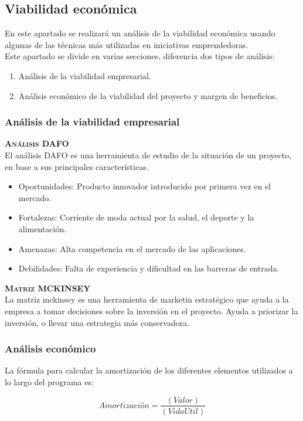 \subsection{Viabilidad económica}
En este apartado se realizará un análisis de la viabilidad económica usando algunas de las técnicas más utilizadas en iniciativas emprendedoras.\\
Este apartado se divide en varias secciones, diferencia dos tipos de análisis:
\begin{enumerate}
\item Análisis  de la viabilidad empresarial.
\item Análisis económico de la viabilidad del proyecto y margen de beneficios.
\end{enumerate}
\subsubsection{Análisis de la viabilidad empresarial}
\textbf{\textsc{Análisis DAFO}}\\
El análisis DAFO \cite{DAFO} es una herramienta de estudio de la situación de un proyecto, en base a sus principales características.
\begin{itemize}
\item Oportunidades: Producto innovador introducido por primera vez en el mercado.
\item Fortalezas: Corriente de moda actual por la salud, el deporte y la alimentación.
\item Amenazas: Alta competencia en el mercado de las aplicaciones.
\item Debilidades: Falta de experiencia y dificultad en las barreras de entrada.
\end{itemize}
\textbf{\textsc{Matriz MCKINSEY}}\\
La matriz mckinsey \cite{matriz} es una herramienta de marketin estratégico que ayuda a la empresa a tomar decisiones sobre la inversión en el proyecto. Ayuda a priorizar la inversión, o llevar una estrategia más conservadora.
\pagebreak
\subsubsection{Análisis económico}
La fórmula para calcular la amortización de los diferentes elementos utilizados a lo largo del programa es:

\begin{equation}
Amortización = \frac{(Valor)}{(VidaUtil)}
\end{equation}

